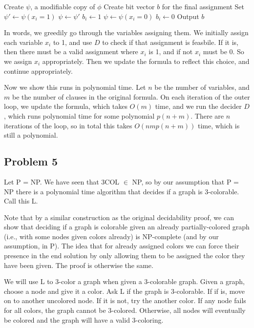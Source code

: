 \documentclass[english]{article}
\begin{document}
\begin{algorithmic}
	\State Create $\psi$, a modifiable copy of $\phi$
	\State Create bit vector $b$ for the final assignment
		\State Set $\psi' \leftarrow \psi(x_i=1)$
			\State $\psi \leftarrow \psi'$
			\State $b_i \leftarrow 1$ 
		\Else
			\State $\psi \leftarrow \psi(x_i=0)$
			\State $b_i \leftarrow 0$ 
		\EndIf
	\EndFor
	\State Output $b$
\EndFunction 
\end{algorithmic}

In words, we greedily go through the variables assigning them. We initially assign each variable $x_i$ to 1, and use
$D$ to check if that assignment is feasbile. If it is, then there must be a valid assignment where $x_i$ is 1, and if
not $x_i$ must be 0. So we assign $x_i$ appropriately. Then we update the formula to reflect this choice, and
continue appropriately.

Now we show this runs in polynomial time. Let $n$ be the number of variables, and $m$ be the number of clauses in the
original formula. On each iteration of the outer loop, we update the formula, which takes $O(m)$ time, and we run
the decider $D$, which runs polynomial time for some polynomial $p(n+m)$. There are $n$ iterations of the loop, so in
total this takes $O(nm p(n+m))$ time, which is still a polynomial.

\subsection*{Problem 5}
Let P = NP. We have seen that 3COL $\in$ NP, so by our assumption that P = NP there is a polynomial
time algorithm that decides if a graph is 3-colorable. Call this L.

Note that by a similar construction as the original decidability proof, we can show that deciding if
a graph is colorable given an already partially-colored graph (i.e., with some nodes given colors
already) is NP-complete (and by our assumption, in P). The idea that for already assigned colors
we can force their presence in the end solution by only allowing them to be assigned the color they
have been given. The proof is otherwise the same.

We will use L to 3-color a graph when given a 3-colorable graph. Given a graph, choose a node and
give it a color. Ask L if the graph is 3-colorable. If if is, move on to another uncolored node. If
it is not, try the another color. If any node fails for all colors, the graph cannot be 3-colored.
Otherwise, all nodes will eventually be colored and the graph will have a valid 3-coloring.
\end{document}
